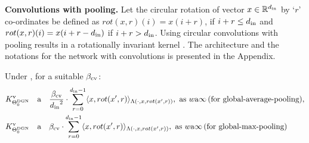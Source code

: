 \textbf{Convolutions with pooling.} Let the circular rotation of vector $x\in\mathbb{R}^{d_{\text{in}}}$ by `$r$' co-ordinates be defined as $rot(x,r)(i)=x(i+ r)$, if $i+r \leq d_{\text{in}}$ and $rot(x,r)(i)=x(i+ r-d_{\text{in}})$ if $i+r > d_{\text{in}}$. Using circular convolutions with pooling results in a rotationally invariant kernel . The architecture and the notations for the network with convolutions is presented in the Appendix.

\begin{theorem}\label{th:conv} Under , for  a suitable $\beta_{\text{cv}}$:
\begin{align*}
&K^{\text{v}}_{\Theta^{\text{DGN}}_0}&{\textnormal{a}}&\quad \frac{\beta_{\text{cv}}}{{d_{\text{in}}}^2} \cdot \sum_{r=0}^{d_{\text{in}}-1} \langle x,rot(x',r)\rangle_{\Lambda(\cdot, x,rot(x',r))},\,\, \text{as}\,\,  w{\textnormal{a}}\infty\,\text{(for global-average-pooling)}, \\
&K^{\text{v}}_{\Theta^{\text{DGN}}_0}&{\textnormal{a}}& \quad{\beta_{\text{cv}}} \cdot \sum_{r=0}^{d_{\text{in}}-1} \langle x,rot(x',r)\rangle_{\Lambda(\cdot, x,rot(x',r))},\,\, \text{as}\,\,  w{\textnormal{a}}\infty\,\text{(for global-max-pooling)}
\end{align*}
\end{theorem}

